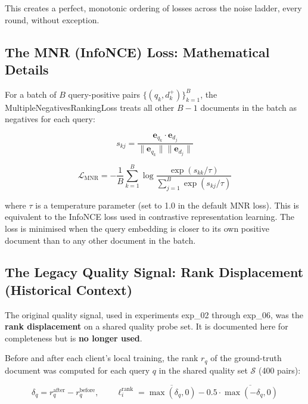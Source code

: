 \documentclass[12pt,a4paper]{article}
\begin{document}
This creates a perfect, monotonic ordering of losses across the noise ladder, every round, without exception.

\subsection{The MNR (InfoNCE) Loss: Mathematical Details}

For a batch of $B$ query-positive pairs $\{(q_k, d_k^+)\}_{k=1}^B$, the MultipleNegativesRankingLoss treats all other $B-1$ documents in the batch as negatives for each query:

\begin{equation}
  s_{kj} = \frac{\mathbf{e}_{q_k} \cdot \mathbf{e}_{d_j}}{\|\mathbf{e}_{q_k}\| \|\mathbf{e}_{d_j}\|}
  \label{eq:mnr_similarity}
\end{equation}

\begin{equation}
  \mathcal{L}_{\text{MNR}} = -\frac{1}{B} \sum_{k=1}^{B} \log \frac{\exp(s_{kk} / \tau)}{\sum_{j=1}^{B} \exp(s_{kj} / \tau)}
  \label{eq:mnr_loss}
\end{equation}

where $\tau$ is a temperature parameter (set to 1.0 in the default MNR loss). This is equivalent to the InfoNCE loss used in contrastive representation learning. The loss is minimised when the query embedding is closer to its own positive document than to any other document in the batch.

\subsection{The Legacy Quality Signal: Rank Displacement (Historical Context)}

The original quality signal, used in experiments exp\_02 through exp\_06, was the \textbf{rank displacement} on a shared quality probe set. It is documented here for completeness but is \textbf{no longer used}.

Before and after each client's local training, the rank $r_q$ of the ground-truth document was computed for each query $q$ in the shared quality set $\mathcal{S}$ (400 pairs):

\begin{equation}
  \delta_q = r_q^{\text{after}} - r_q^{\text{before}}, \qquad
  \ell_i^{\text{rank}} = \overline{\max(\delta_q, 0)} - 0.5 \cdot \overline{\max(-\delta_q, 0)}
  \label{eq:rank_displacement}
\end{equation}
\end{document}
